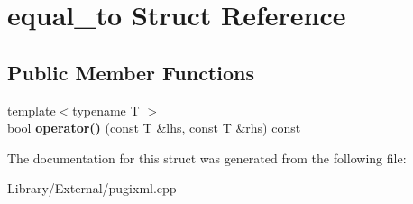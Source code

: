 \hypertarget{structequal__to}{}\section{equal\+\_\+to Struct Reference}
\label{structequal__to}
\subsection*{Public Member Functions}
\begin{DoxyCompactItemize}
\item 
\hypertarget{structequal__to_acaf39da83a307280fef2f11691386b0e}{}{\footnotesize template$<$typename T $>$ }\\bool {\bfseries operator()} (const T \&lhs, const T \&rhs) const \label{structequal__to_acaf39da83a307280fef2f11691386b0e}

\end{DoxyCompactItemize}


The documentation for this struct was generated from the following file\+:\begin{DoxyCompactItemize}
\item 
Library/\+External/pugixml.\+cpp\end{DoxyCompactItemize}
